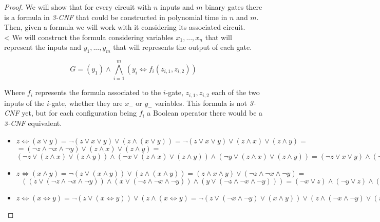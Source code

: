   \begin{proof}
    We will show that for every circuit with $n$ inputs and $m$ binary gates there is a formula in \emph{3-CNF}  that could be constructed in polynomial time in $n$ and $m$. Then, given a formula we will work with it considering its associated circuit.\\
    <
    We will construct the formula considering variables $x_1,...,x_n$ that will represent the inputs and $y_1,...,y_m$ that will represents the output of each gate. 

    $$ G = (y_1) \wedge \bigwedge_{i=1}^m (y_i \iff f_i(z_{i,1},z_{i,2}))$$

    Where $f_i$ represents the formula associated to the $i$-gate, $z_{i,1},z_{i,2}$ each of the two inputs of the $i$-gate, whether they are $x_-$ or $y_-$ variables. This formula is not \emph{3-CNF} yet, but for each configuration being $f_i$ a Boolean operator there would be a \emph{3-CNF} equivalent.

    \begin{itemize}
    \item $z \iff( x \vee y )  = \neg  ( z \vee  x \vee y    ) \vee (z \wedge ( x \vee y )  ) = \neg  ( z \vee  x \vee y    ) \vee (z \wedge x)  \vee (z \wedge y ) =$\\$= ( \neg  z \wedge  \neg  x \wedge \neg   y    ) \vee (z \wedge x)  \vee (z \wedge y )  =$$
      (\neg  z \vee (z \wedge x)  \vee (z \wedge y ))  \wedge  
      (\neg  x \vee (z \wedge x)  \vee (z \wedge y )) \wedge
      (\neg  y \vee (z \wedge x)  \vee (z \wedge y ))   =
      (\neg  z \vee x  \vee y )  \wedge  
      (\neg  x \vee z  ) \wedge
      (\neg  y \vee z ) $   
    \item $z \iff( x \wedge y ) = \neg ( z \vee ( x \wedge y )) \vee (z \wedge ( x \wedge y )) = (z\wedge x \wedge y ) \vee  (\neg  z\wedge \neg  x \wedge \neg  y )  =$\\$\ \ \ ((z\vee  (\neg  z\wedge \neg  x \wedge \neg  y )  ) \wedge (x \vee  (\neg  z\wedge \neg  x \wedge \neg  y )  ) \wedge (y\vee  (\neg  z\wedge \neg  x \wedge \neg  y )  ) ) = (\neg  x \vee z) \wedge (\neg  y \vee z ) \wedge (\neg  z \vee x ) \wedge (\neg  y \vee x ) \wedge(\neg  z\vee y )\wedge (\neg  x\vee y )$
      
    \item $z \iff( x \iff y ) =  \neg ( z \vee ( x \iff y ) ) \vee (z \wedge ( x \iff y ) = \neg ( z \vee (\neg  x \wedge \neg  y) \vee (x \wedge y)) \vee (z \wedge(\neg  x \wedge \neg  y) \vee (x \wedge y))  )=(\neg  z \wedge \neg  (\neg  x \wedge \neg  y) \wedge \neg  (x \wedge y)) \vee (z \wedge(\neg  x \wedge \neg  y) \vee (x \wedge y))  )=(\neg  z \wedge  (x \vee  y) \wedge (\neg  x \vee \neg  y)) \vee (z \wedge(\neg  x \wedge \neg  y) \vee (x \wedge y))  )=z \vee ( \neg  x \wedge \neg  y) = (\neg x \vee \neg y \vee z) \wedge (\neg x \vee \neg z \vee y) \wedge (y \vee z \vee x) \wedge (y \vee \neg y \vee x) \wedge (\neg z \vee z \vee x) \wedge (\neg z \vee \neg y \vee x)$
      

\end{itemize}
\end{proof}
